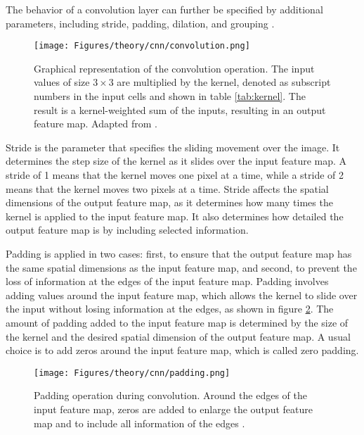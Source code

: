 The behavior of a convolution layer can further be specified by additional parameters, including stride, padding, dilation, and grouping \autocite{Dumoulin.Visin2018,Szeliski2022}.

\begin{figure}[htb]
    \centering
    \texttt{[image: Figures/theory/cnn/convolution.png]}
    \caption[Convolution]{Graphical representation of the convolution operation. The input values of size \( 3 \times 3 \) are multiplied by the kernel, denoted as subscript numbers in the input cells and shown in table \ref{tab:kernel}. The result is a kernel-weighted sum of the inputs, resulting in an output feature map. Adapted from \textcite{Dumoulin.Visin2018}.}
    \label{fig:convolution}
\end{figure}

Stride is the parameter that specifies the sliding movement over the image. It determines the step size of the kernel as it slides over the input feature map. A stride of 1 means that the kernel moves one pixel at a time, while a stride of 2 means that the kernel moves two pixels at a time. Stride affects the spatial dimensions of the output feature map, as it determines how many times the kernel is applied to the input feature map. It also determines how detailed the output feature map is by including selected information.

Padding is applied in two cases: first, to ensure that the output feature map has the same spatial dimensions as the input feature map, and second, to prevent the loss of information at the edges of the input feature map. Padding involves adding values around the input feature map, which allows the kernel to slide over the input without losing information at the edges, as shown in figure \ref{fig:padding}. The amount of padding added to the input feature map is determined by the size of the kernel and the desired spatial dimension of the output feature map. A usual choice is to add zeros around the input feature map, which is called zero padding.

\begin{figure}[htb]
    \centering
    \texttt{[image: Figures/theory/cnn/padding.png]}
    \caption[Padding]{Padding operation during convolution. Around the edges of the input feature map, zeros are added to enlarge the output feature map and to include all information of the edges \autocite{Dumoulin.Visin2018}.}
    \label{fig:padding}
\end{figure}

